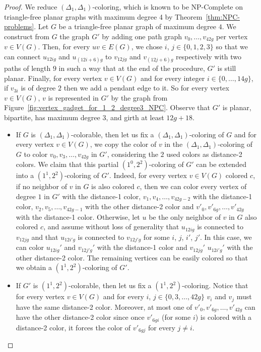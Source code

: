 \documentclass{article}
\newcommand{\colo}[2]{(1^{#1}, 2^{#2})}
\begin{document}
\begin{proof}
    We reduce {\sc $(\Delta_1, \Delta_1)$-coloring}, which is known to be NP-Complete on triangle-free planar graphs with maximum degree 4 by Theorem~\ref{thm:NPC-problems}. 
    Let $G$ be a triangle-free planar graph of maximum degree $4$. We construct from $G$ the graph $G'$ by adding one path graph $v_0, \dots, v_{42g}$ per vertex $v \in V(G)$. Then, for every $uv \in E(G)$, we chose $i$, $j \in \{0, 1, 2, 3\}$ so that we can connect $u_{12ig}$ and $u_{(12i + 6)g}$ to $v_{12jg}$ and $v_{(12j + 6)g}$ respectively with two paths of length $9$ in such a way that at the end of the procedure, $G'$ is still planar. Finally, for every vertex $v \in V(G)$ and for every integer $i \in \{0, \dots, 14g\}$, if $v_{3i}$ is of degree $2$ then we add a pendant edge to it. So for every vertex $v \in V(G)$, $v$ is represented in $G'$ by the graph from Figure~\ref{fig:vertex_gadget_for_1_2_degree3_NPC}. Observe that $G'$ is planar, bipartite, has maximum degree $3$, and girth at least $12g + 18$.
    \begin{itemize}
        \item If $G$ is $(\Delta_1, \Delta_1)$-colorable, then let us fix a $(\Delta_1, \Delta_1)$-coloring of $G$ and for every vertex $v \in V(G)$, we copy the color of $v$ in the $(\Delta_1, \Delta_1)$-coloring of $G$ to color $v_0, v_3, \dots, v_{42g}$ in $G'$, considering the $2$ used colors as distance-2 colors. We claim that this partial $\colo{0}{2}$-coloring of $G'$ can be extended into a $\colo{1}{2}$-coloring of $G'$. Indeed, for every vertex $v \in V(G)$ colored $c$, if no neighbor of $v$ in $G$ is also colored $c$, then we can color every vertex of degree $1$ in $G'$ with the distance-1 color, $v_1, v_4, \dots, v_{42g - 2}$ with the distance-1 color, $v_2, v_5, \dots, v_{42g - 1}$ with the other distance-2 color and $v'_0, v'_{6g}, \dots, v'_{42g}$ with the distance-1 color. Otherwise, let $u$ be the only neighbor of $v$ in $G$ also colored $c$, and assume without loss of generality that $u_{12ig}$ is connected to $v_{12jg}$ and that $u_{12i'g}$ is connected to $v_{12j'g}$ for some $i$, $j$, $i'$, $j'$. In this case, we can color $u_{12ig}'$ and $v_{12j'g}'$ with the distance-1 color and $v_{12jg}'$ $u_{12i'g}'$ with the other distance-2 color. The remaining vertices can be easily colored so that we obtain a $\colo{1}{2}$-coloring of $G'$.
        \item If $G'$ is $\colo{1}{2}$-colorable, then let us fix a $\colo{1}{2}$-coloring. Notice that for every vertex $v \in V(G)$ and for every $i$, $j \in \{0, 3, \dots, 42g\}$ $v_i$ and $v_j$ must have the same distance-2 color. Moreover, at most one of $v'_0, v'_{6g}, \dots, v'_{42g}$ can have the other distance-2 color since once $v'_{6gi}$ (for some $i$) is colored with a distance-2 color, it forces the color of $v'_{6gj}$ for every $j \neq i$. 

\end{itemize}
\end{proof}
\end{document}
